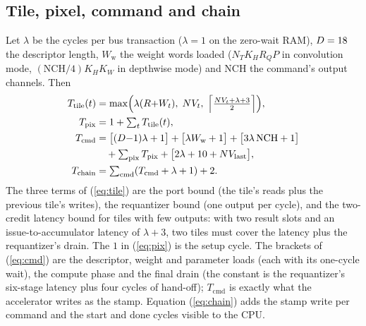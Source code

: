 \documentclass[journal]{IEEEtran}
\begin{document}
\subsection{Tile, pixel, command and chain}
Let $\lambda$ be the cycles per bus transaction ($\lambda=1$ on the zero-wait RAM), $D=18$ the descriptor length, $W_{\mathrm{w}}$ the weight words loaded ($N_T K_H R_Q P$ in convolution mode, $(\mathrm{NCH}/4)K_HK_W$ in depthwise mode) and NCH the command's output channels. Then
\begin{align}
T_{\mathrm{tile}}(t) &= \max\Bigl(\lambda(R{+}W_t),\; NV_t,\; \Bigl\lceil\tfrac{NV_t+\lambda+3}{2}\Bigr\rceil\Bigr),\label{eq:tile}\\
T_{\mathrm{pix}} &= 1+\textstyle\sum_t T_{\mathrm{tile}}(t),\label{eq:pix}\\
T_{\mathrm{cmd}} &= \bigl[(D{-}1)\lambda+1\bigr] + \bigl[\lambda W_{\mathrm{w}}+1\bigr] + \bigl[3\lambda\,\mathrm{NCH}+1\bigr]\nonumber\\
&\quad + \textstyle\sum_{\mathrm{pix}} T_{\mathrm{pix}} + \bigl[2\lambda+10+NV_{\mathrm{last}}\bigr],\label{eq:cmd}\\
T_{\mathrm{chain}} &= \textstyle\sum_{\mathrm{cmd}} (T_{\mathrm{cmd}}+\lambda+1) + 2.\label{eq:chain}
\end{align}
The three terms of (\ref{eq:tile}) are the port bound (the tile's reads plus the previous tile's writes), the requantizer bound (one output per cycle), and the two-credit latency bound for tiles with few outputs: with two result slots and an issue-to-accumulator latency of $\lambda+3$, two tiles must cover the latency plus the requantizer's drain. The $1$ in (\ref{eq:pix}) is the setup cycle. The brackets of (\ref{eq:cmd}) are the descriptor, weight and parameter loads (each with its one-cycle wait), the compute phase and the final drain (the constant is the requantizer's six-stage latency plus four cycles of hand-off); $T_{\mathrm{cmd}}$ is exactly what the accelerator writes as the stamp. Equation (\ref{eq:chain}) adds the stamp write per command and the start and done cycles visible to the CPU.
\end{document}
